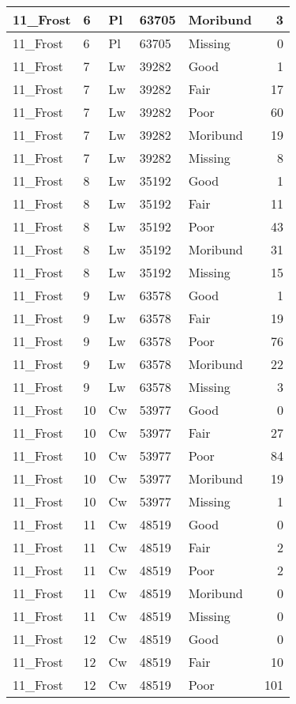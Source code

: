 \documentclass[
]{article}
\begin{document}
\begin{tabular}{l|l|l|l|l|r}
\hline
11\_Frost & 6 & Pl & 63705 & Moribund & 3\\
\hline
11\_Frost & 6 & Pl & 63705 & Missing & 0\\
\hline
11\_Frost & 7 & Lw & 39282 & Good & 1\\
\hline
11\_Frost & 7 & Lw & 39282 & Fair & 17\\
\hline
11\_Frost & 7 & Lw & 39282 & Poor & 60\\
\hline
11\_Frost & 7 & Lw & 39282 & Moribund & 19\\
\hline
11\_Frost & 7 & Lw & 39282 & Missing & 8\\
\hline
11\_Frost & 8 & Lw & 35192 & Good & 1\\
\hline
11\_Frost & 8 & Lw & 35192 & Fair & 11\\
\hline
11\_Frost & 8 & Lw & 35192 & Poor & 43\\
\hline
11\_Frost & 8 & Lw & 35192 & Moribund & 31\\
\hline
11\_Frost & 8 & Lw & 35192 & Missing & 15\\
\hline
11\_Frost & 9 & Lw & 63578 & Good & 1\\
\hline
11\_Frost & 9 & Lw & 63578 & Fair & 19\\
\hline
11\_Frost & 9 & Lw & 63578 & Poor & 76\\
\hline
11\_Frost & 9 & Lw & 63578 & Moribund & 22\\
\hline
11\_Frost & 9 & Lw & 63578 & Missing & 3\\
\hline
11\_Frost & 10 & Cw & 53977 & Good & 0\\
\hline
11\_Frost & 10 & Cw & 53977 & Fair & 27\\
\hline
11\_Frost & 10 & Cw & 53977 & Poor & 84\\
\hline
11\_Frost & 10 & Cw & 53977 & Moribund & 19\\
\hline
11\_Frost & 10 & Cw & 53977 & Missing & 1\\
\hline
11\_Frost & 11 & Cw & 48519 & Good & 0\\
\hline
11\_Frost & 11 & Cw & 48519 & Fair & 2\\
\hline
11\_Frost & 11 & Cw & 48519 & Poor & 2\\
\hline
11\_Frost & 11 & Cw & 48519 & Moribund & 0\\
\hline
11\_Frost & 11 & Cw & 48519 & Missing & 0\\
\hline
11\_Frost & 12 & Cw & 48519 & Good & 0\\
\hline
11\_Frost & 12 & Cw & 48519 & Fair & 10\\
\hline
11\_Frost & 12 & Cw & 48519 & Poor & 101\\

\end{tabular}
\end{document}
